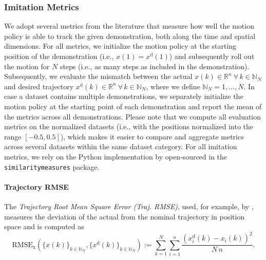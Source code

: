 \subsubsection{Imitation Metrics}
We adopt several metrics from the literature that measure how well the motion policy is able to track the given demonstration, both along the time and spatial dimensions.
For all metrics, we initialize the motion policy at the starting position of the demonstration (i.e., $x(1) = x^\mathrm{d}(1)$) and subsequently roll out the motion for $N$ steps (i.e., as many steps as included in the demonstration). Subsequently, we evaluate the mismatch between the actual $x(k)  \in \mathbb{R}^n \: \forall \, k \in \mathbb{N}_N$ and desired trajectory $x^\mathrm{d}(k) \in \mathbb{R}^n \: \forall \, k \in \mathbb{N}_N$, where we define $\mathbb{N}_N = 1,\dots,N$. In case a dataset contains multiple demonstrations, we separately initialize the motion policy at the starting point of each demonstration and report the mean of the metrics across all demonstrations.
Please note that we compute all evaluation metrics on the normalized datasets (i.e., with the positions normalized into the range $[-0.5, 0.5]$), which makes it easier to compare and aggregate metrics across several datasets within the same dataset category.
For all imitation metrics, we rely on the Python implementation by \citet{jekel2019similarity} open-sourced in the \texttt{similaritymeasures} package.

\paragraph{Trajectory RMSE}
The \emph{Trajectory Root Mean Square Error (Traj. \gls{RMSE})}, used, for example, by \citet{khadivar2021learning}, measures the deviation of the actual from the nominal trajectory in position space and is computed as
\begin{equation}
    \mathrm{RMSE}_\mathrm{x}\left (\{x(k)\}_{k\in\mathbb{N}_N},\{x^{\mathrm d}(k)\}_{k\in\mathbb{N}_N} \right ) := \sum_{k=1}^{N} \sum_{i=1}^{n} \frac{\left ( x_i^\mathrm{d}(k) - x_i(k) \right )^2}{N \, n}.
\end{equation}

